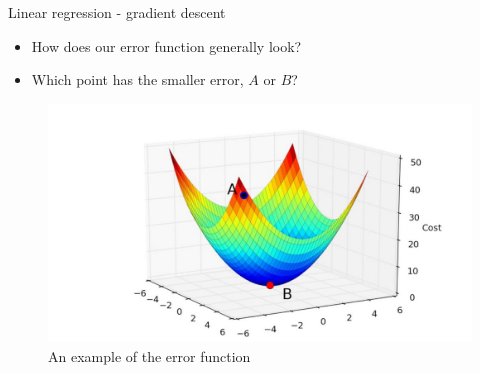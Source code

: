 \documentclass[aspectratio=169]{beamer}
\begin{document}
\begin{frame}{Linear regression - gradient descent}
    \begin{itemize}
        \item How does our error function generally look?
        \item Which point has the smaller error, $A$ or $B$?
    \end{itemize}
    \begin{center}
        \begin{figure}
            \includegraphics[scale=0.23]{./images/regressionGradient.jpg}
            \caption{An example of the error function}
        \end{figure}
    \end{center}
\end{frame}
\end{document}
